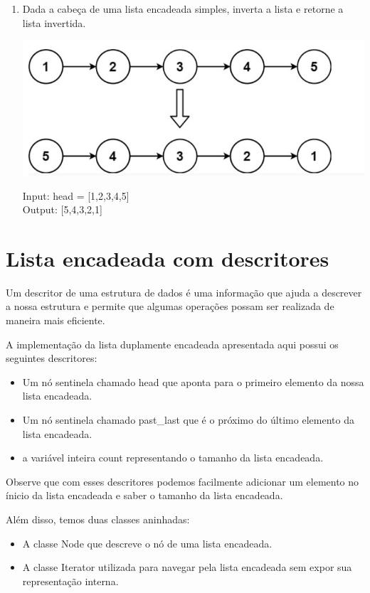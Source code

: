 \begin{enumerate}
\item Dada a cabeça de uma lista encadeada simples, inverta a lista e retorne a lista invertida.

\includegraphics[scale=0.5]{images/reverseList.png}

Input: head = [1,2,3,4,5]\\
Output: [5,4,3,2,1]\\



\end{enumerate}


\section{Lista encadeada com descritores}

Um descritor de uma estrutura de dados é uma informação que ajuda a descrever a nossa estrutura e permite que algumas operações possam ser realizada de maneira mais eficiente.

A implementação da lista duplamente encadeada apresentada aqui possui os seguintes descritores:
\begin{itemize}
    \item Um nó sentinela chamado head que aponta para o primeiro elemento da nossa lista encadeada.
    \item Um nó sentinela chamado past\_last que é o próximo do último elemento da lista encadeada.
    \item a variável inteira count representando o tamanho da lista encadeada.
\end{itemize}

Observe que com esses descritores podemos facilmente adicionar um elemento no ínicio da lista encadeada e saber o tamanho da lista encadeada.

Além disso, temos duas classes aninhadas:

\begin{itemize}
    \item A classe Node que descreve o nó de uma lista encadeada.
    \item A classe Iterator utilizada para navegar pela lista encadeada sem expor sua representação interna.
\end{itemize}


